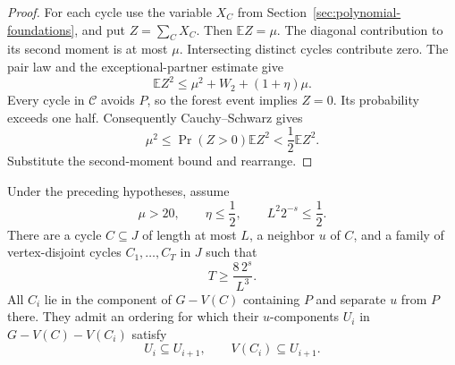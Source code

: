 \begin{proof}
For each cycle use the variable $X_C$ from Section~\ref{sec:polynomial-foundations}, and put $Z=\sum_CX_C$.
Then $\mathbb EZ=\mu$.
The diagonal contribution to its second moment is at most $\mu$.
Intersecting distinct cycles contribute zero.
The pair law and the exceptional-partner estimate give
\[
 \mathbb EZ^2\le\mu^2+W_2+(1+\eta)\mu.
\]
Every cycle in $\mathcal C$ avoids $P$, so the forest event implies $Z=0$.
Its probability exceeds one half.
Consequently Cauchy--Schwarz gives
\[
 \mu^2\le\Pr(Z>0)\mathbb EZ^2<\frac12\mathbb EZ^2.
\]
Substitute the second-moment bound and rearrange.
\end{proof}

\begin{lemma}
\label{lem:sharp-nested-chain}
Under the preceding hypotheses, assume
\[
 \mu>20,\qquad \eta\le\frac12,\qquad L^2 2^{-s}\le\frac12.
\]
There are a cycle $C\subseteq J$ of length at most $L$, a neighbor $u$ of $C$, and a family of vertex-disjoint cycles $C_1,\ldots,C_T$ in $J$ such that
\[
 T\ge\frac{8\,2^s}{L^3}.
\]
All $C_i$ lie in the component of $G-V(C)$ containing $P$ and separate $u$ from $P$ there.
They admit an ordering for which their $u$-components $U_i$ in $G-V(C)-V(C_i)$ satisfy
\[
 U_i\subseteq U_{i+1},\qquad V(C_i)\subseteq U_{i+1}.
\]
\end{lemma}

